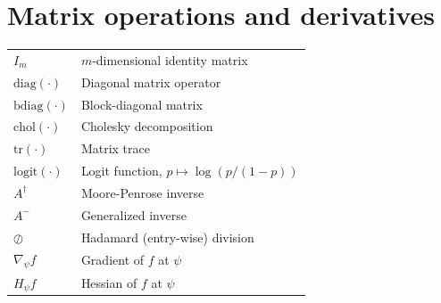\section*{Matrix operations and derivatives}
\noindent
\begin{tabular}{@{} p{\symcolwidth} p{\dimexpr\linewidth-\symcolwidth-2\tabcolsep\relax} @{}}
$I_m$                              & $m$-dimensional identity matrix \\
$\mathrm{diag}(\cdot)$             & Diagonal matrix operator \\
$\mathrm{bdiag}(\cdot)$            & Block-diagonal matrix \\
$\mathrm{chol}(\cdot)$             & Cholesky decomposition \\
$\mathrm{tr}(\cdot)$               & Matrix trace \\
$\mathrm{logit}(\cdot)$            & Logit function, $p \mapsto \log(p / (1 - p))$ \\
$A^{\dagger}$                      & Moore-Penrose inverse \\
$A^{-}$                            & Generalized inverse \\
$\oslash$                          & Hadamard (entry-wise) division \\
$\nabla_\psi f$                    & Gradient of $f$ at $\psi$ \\
$H_\psi f$                         & Hessian of $f$ at $\psi$ \\
\end{tabular}